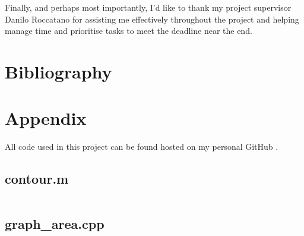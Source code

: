 \documentclass[12pt,english]{article}
\begin{document}
Finally, and perhaps most importantly, I'd like to thank my project supervisor
Danilo Roccatano for assisting me effectively throughout the project and helping manage time
and prioritise tasks to meet the deadline near the end.

\pagebreak
\section{Bibliography}



\pagebreak
\section{Appendix}
All code used in this project can be found hosted on my personal GitHub
\cite{smith:2024}.

\subsection*{contour.m}
\label{code:contour}
\inputminted[breakanywhere=true, tabsize=4]{matlab}{../code/contour/contour.m}

\subsection*{graph\_area.cpp}
\label{code:grapharea}
\inputminted[breakanywhere=true, tabsize=4]{cpp}{../code/elliptic_fourier/graph_area.cpp}
\end{document}

